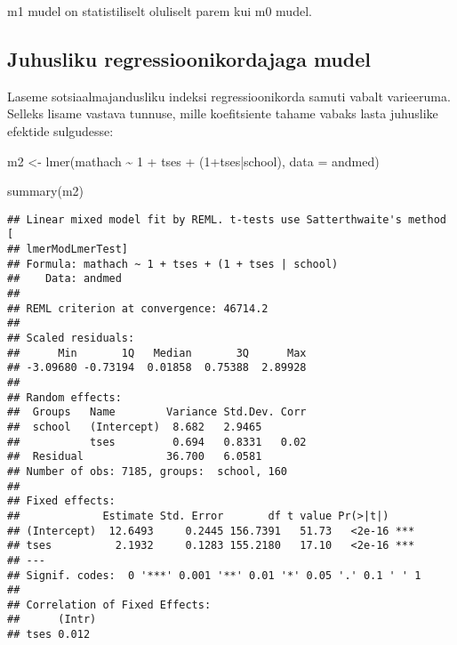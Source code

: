 \documentclass[
]{book}
\newenvironment{Shaded}{\begin{snugshade}}{\end{snugshade}}
\newcommand{\AttributeTok}[1]{\textcolor[rgb]{0.77,0.63,0.00}{#1}}
\newcommand{\DecValTok}[1]{\textcolor[rgb]{0.00,0.00,0.81}{#1}}
\newcommand{\FunctionTok}[1]{\textcolor[rgb]{0.00,0.00,0.00}{#1}}
\newcommand{\NormalTok}[1]{#1}
\newcommand{\OtherTok}[1]{\textcolor[rgb]{0.56,0.35,0.01}{#1}}
\newcommand{\SpecialCharTok}[1]{\textcolor[rgb]{0.00,0.00,0.00}{#1}}
\begin{document}
m1 mudel on statistiliselt oluliselt parem kui m0 mudel.

\hypertarget{juhusliku-regressioonikordajaga-mudel}{%
\subsection{Juhusliku regressioonikordajaga mudel}\label{juhusliku-regressioonikordajaga-mudel}}

Laseme sotsiaalmajandusliku indeksi regressioonikorda samuti vabalt varieeruma. Selleks lisame vastava tunnuse, mille koefitsiente tahame vabaks lasta juhuslike efektide sulgudesse:

\begin{Shaded}
\begin{Highlighting}[]
\NormalTok{m2 }\OtherTok{\textless{}{-}} \FunctionTok{lmer}\NormalTok{(mathach }\SpecialCharTok{\textasciitilde{}} \DecValTok{1} \SpecialCharTok{+}\NormalTok{ tses }\SpecialCharTok{+}\NormalTok{ (}\DecValTok{1}\SpecialCharTok{+}\NormalTok{tses}\SpecialCharTok{|}\NormalTok{school), }\AttributeTok{data =}\NormalTok{ andmed)}
\end{Highlighting}
\end{Shaded}

\begin{Shaded}
\begin{Highlighting}[]
\FunctionTok{summary}\NormalTok{(m2)}
\end{Highlighting}
\end{Shaded}

\begin{verbatim}
## Linear mixed model fit by REML. t-tests use Satterthwaite's method [
## lmerModLmerTest]
## Formula: mathach ~ 1 + tses + (1 + tses | school)
##    Data: andmed
## 
## REML criterion at convergence: 46714.2
## 
## Scaled residuals: 
##      Min       1Q   Median       3Q      Max 
## -3.09680 -0.73194  0.01858  0.75388  2.89928 
## 
## Random effects:
##  Groups   Name        Variance Std.Dev. Corr
##  school   (Intercept)  8.682   2.9465       
##           tses         0.694   0.8331   0.02
##  Residual             36.700   6.0581       
## Number of obs: 7185, groups:  school, 160
## 
## Fixed effects:
##             Estimate Std. Error       df t value Pr(>|t|)    
## (Intercept)  12.6493     0.2445 156.7391   51.73   <2e-16 ***
## tses          2.1932     0.1283 155.2180   17.10   <2e-16 ***
## ---
## Signif. codes:  0 '***' 0.001 '**' 0.01 '*' 0.05 '.' 0.1 ' ' 1
## 
## Correlation of Fixed Effects:
##      (Intr)
## tses 0.012
\end{verbatim}
\end{document}
